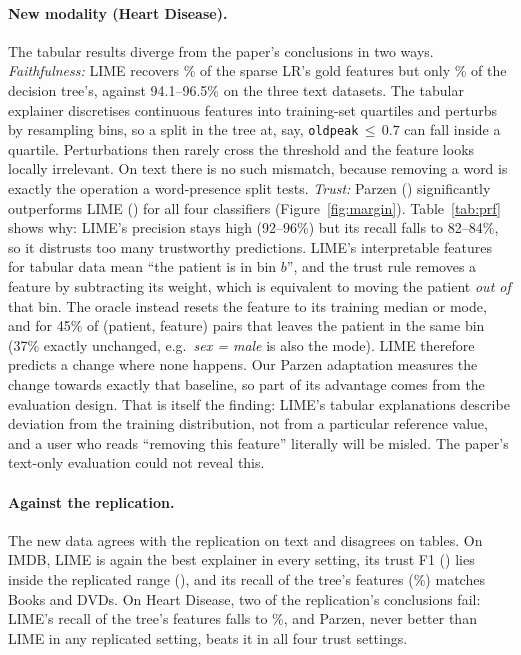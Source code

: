 \paragraph{New modality (Heart Disease).} The tabular results diverge from the paper's conclusions in two ways. \emph{Faithfulness:} LIME recovers \HeartLRRecall{}\% of the sparse LR's gold features but only \HeartTreeRecall{}\% of the decision tree's, against 94.1--96.5\% on the three text datasets. The tabular explainer discretises continuous features into training-set quartiles and perturbs by resampling bins, so a split in the tree at, say, \texttt{oldpeak}\,${\le}\,0.7$ can fall inside a quartile. Perturbations then rarely cross the threshold and the feature looks locally irrelevant. On text there is no such mismatch, because removing a word is exactly the operation a word-presence split tests. \emph{Trust:} Parzen (\HeartParzenTrustRange{}) significantly outperforms LIME (\HeartLimeTrustRange{}) for all four classifiers (Figure~\ref{fig:margin}). Table~\ref{tab:prf} shows why: LIME's precision stays high (92--96\%) but its recall falls to 82--84\%, so it distrusts too many trustworthy predictions. LIME's interpretable features for tabular data mean ``the patient is in bin $b$'', and the trust rule removes a feature by subtracting its weight, which is equivalent to moving the patient \emph{out of} that bin. The oracle instead resets the feature to its training median or mode, and for 45\% of (patient, feature) pairs that leaves the patient in the same bin (37\% exactly unchanged, e.g.\ \emph{sex = male} is also the mode). LIME therefore predicts a change where none happens. Our Parzen adaptation measures the change towards exactly that baseline, so part of its advantage comes from the evaluation design. That is itself the finding: LIME's tabular explanations describe deviation from the training distribution, not from a particular reference value, and a user who reads ``removing this feature'' literally will be misled. The paper's text-only evaluation could not reveal this.

\paragraph{Against the replication.} The new data agrees with the replication on text and disagrees on tables. On IMDB, LIME is again the best explainer in every setting, its trust F1 (\IMDBLimeTrustRange{}) lies inside the replicated range (\ReplTrustRange{}), and its recall of the tree's features (\IMDBTreeRecall{}\%) matches Books and DVDs. On Heart Disease, two of the replication's conclusions fail: LIME's recall of the tree's features falls to \HeartTreeRecall{}\%, and Parzen, never better than LIME in any replicated setting, beats it in all four trust settings.

